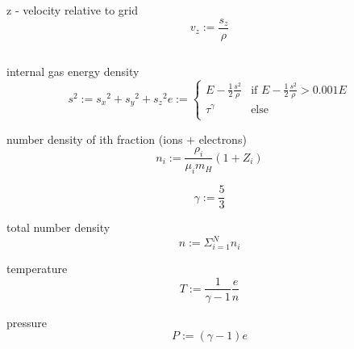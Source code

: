 \documentclass{article}
\begin{document}
z - velocity relative to grid
\begin{equation}
v_z  := \frac{s_z}{\rho} 
\end{equation}

\begin{equation}
\end{equation}

internal gas energy density
\begin{equation}
s^2  :=  {s_x}^2 + {s_y}^2 + {s_z}^2
e    :=  \begin{cases}
       E - \frac{1}{2} \frac{s^2}{\rho} & \text{if } E - \frac{1}{2} \frac{s^2}{\rho} > 0.001 E \\
       \tau^\gamma & \text{else} \\
     \end{cases} 
\end{equation}

number density of ith fraction (ions + electrons)
\begin{equation}
n_i := \frac{\rho_i}{\mu_i m_H} \left ( 1 + Z_i \right ) 
\end{equation}

\begin{equation}
\gamma := \frac{5}{3}
\end{equation}

total number density
\begin{equation}
n := \Sigma_{i=1}^N  n_i
\end{equation}

temperature
\begin{equation}
T := \frac{1}{\gamma-1} \frac{e}{n}
\end{equation}

pressure
\begin{equation}
P := \left(\gamma-1\right) e
\end{equation}
\end{document}
